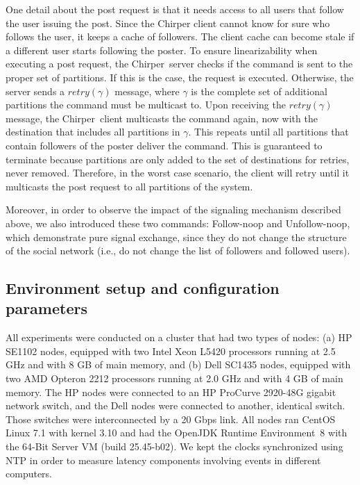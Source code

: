 \documentclass[11pt]{article}
\newcommand{\appname}{Chirper} %
\begin{document}
One detail about the post request is that it needs access to all users that follow the user issuing the post.
Since the \appname{} client cannot know for sure who follows the user, it keeps a cache of followers.
The client cache can become stale if a different user starts following the poster.
To ensure linearizability when executing a post request, the \appname\ server checks if the command is sent to the proper set of partitions. 
If this is the case, the request is executed.
Otherwise, the server sends a $retry(\gamma)$ message, where $\gamma$ is the complete set of additional partitions the command must be multicast to. Upon receiving the $retry(\gamma)$ message, the \appname\ client multicasts the command again, now with the destination that includes all partitions in $\gamma$. This repeats until all partitions that contain followers of the poster deliver the command. This is guaranteed to terminate because partitions are only added to the set of destinations for retries, never removed. Therefore, in the worst case scenario, the client will retry until it multicasts the post request to all partitions of the system.

Moreover, in order to observe the impact of the signaling mechanism described above, we also introduced these two commands: Follow-noop and Unfollow-noop, which demonstrate pure signal exchange, since they do not change the structure of the social network (i.e., do not change the list of followers and followed users).

\label{sec:evaluation:app}
\subsection{Environment setup and configuration parameters}

All experiments were conducted on a cluster that had two types of nodes: (a) HP SE1102 nodes, equipped with two Intel Xeon L5420 processors running at 2.5 GHz and with 8 GB of main memory, and (b) Dell SC1435 nodes, equipped with two AMD Opteron 2212 processors running at 2.0 GHz and with 4 GB of main memory. The HP nodes were connected to an HP ProCurve 2920-48G gigabit network switch, and the Dell nodes were connected to another, identical switch. Those switches were interconnected by a 20 Gbps link.
All nodes ran CentOS Linux 7.1 with kernel 3.10 and had the OpenJDK Runtime Environment~8 with the \mbox{64-Bit} Server VM (build 25.45-b02).
We kept the clocks synchronized using NTP in order to measure latency components involving events in different computers.
\end{document}
